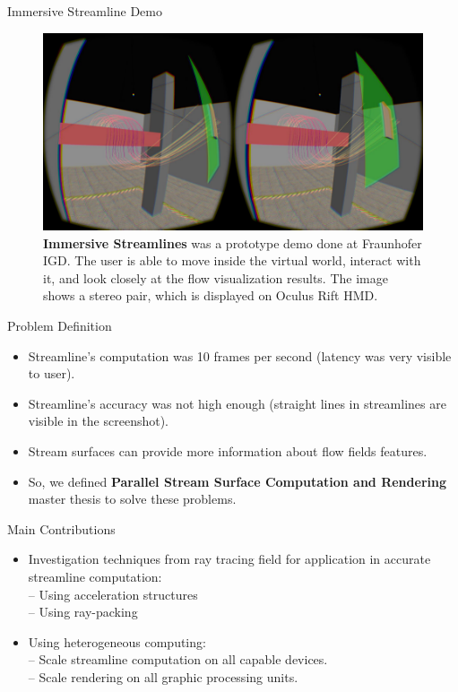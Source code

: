 \documentclass{beamer}
\begin{document}
\begin{frame}{Immersive Streamline Demo}

	\begin{figure}[ht!]
	\centering
	\includegraphics[width=0.9\linewidth]{./figures/vr.png}
	\caption{\textbf{Immersive Streamlines} was a prototype demo done at Fraunhofer IGD. The user is able to move inside the virtual world, interact with it, and look closely at the flow visualization results. The image shows a stereo pair, which is displayed on Oculus Rift HMD. }
	\label{fig:vr_irpv}
	
	\end{figure}
\end{frame}

\begin{frame}{Problem Definition}
	\begin{itemize}
		\item Streamline's computation was 10 frames per second (latency was very visible to user).
		\item Streamline's accuracy was not high enough (straight lines in streamlines are visible in the screenshot).
		\item Stream surfaces can provide more information about flow fields features.
		\item So, we defined \textbf{Parallel Stream Surface Computation and Rendering} master thesis to solve these problems.		
	\end{itemize}
\end{frame}

\begin{frame}{Main Contributions}
	\begin{itemize}
		\item Investigation techniques from ray tracing field for application in accurate streamline computation:\\
		  -- Using acceleration structures\\
		  -- Using ray-packing\\
		\item Using heterogeneous computing:\\
		  -- Scale streamline computation on all capable devices.\\
		  -- Scale rendering on all graphic processing units.\\
	\end{itemize}
\end{frame}
\end{document}
